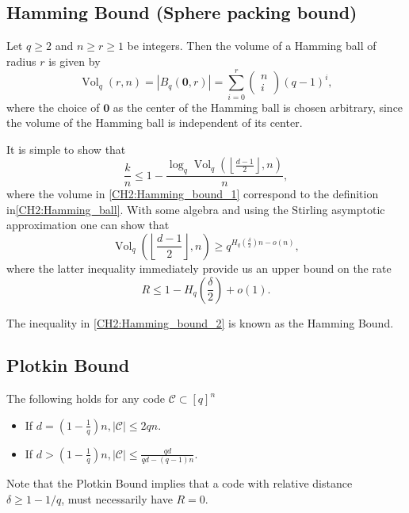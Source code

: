 \subsection{Hamming Bound (Sphere packing bound)}
\begin{definition}
Let $ q\geq2$ and $n \geq r \geq 1$ be integers. Then the volume of a Hamming ball of radius $r$ is given by
\begin{equation}
\operatorname{Vol}_{q}(r, n)=\left|B_{q}(\mathbf{0}, r)\right|=\sum_{i=0}^{r}\left(\begin{array}{l}
n \\
i
\end{array}\right)(q-1)^{i},
\label{CH2:Hamming_ball}
\end{equation}
where the choice of $\mathbf{0}$ as the center of the Hamming ball is chosen arbitrary, since the volume of the Hamming ball is independent of its center.
\end{definition}
It is simple to show that
\begin{equation}
\frac{k}{n} \leq 1-\frac{\log _{q} \operatorname{Vol}_{q}\left(\left\lfloor\frac{d-1}{2}\right\rfloor, n\right)}{n},
\label{CH2:Hamming_bound_1}
\end{equation}
where the volume in \eqref{CH2:Hamming_bound_1} correspond to the definition in\eqref{CH2:Hamming_ball}. With some algebra and using the Stirling asymptotic approximation one can show that
\begin{equation}
\operatorname{Vol}_{q}\left(\left\lfloor\frac{d-1}{2}\right\rfloor, n\right) \geq q^{H_{q}\left(\frac{\delta}{2}\right) n-o(n)},
\end{equation}
where the latter inequality immediately provide us an upper bound on the rate
\begin{equation}
R \leq 1-H_{q}\left(\frac{\delta}{2}\right)+o(1).
\label{CH2:Hamming_bound_2}
\end{equation}

The inequality in \eqref{CH2:Hamming_bound_2} is known as the Hamming Bound.

\subsection{Plotkin Bound}
\begin{definition}
The following holds for any code $\mathcal{C}\subset [q]^n$ 
\begin{itemize}
\item If $d=\left(1-\frac{1}{q}\right) n,|\mathcal{C}| \leq 2 q n$.
\item If $d>\left(1-\frac{1}{q}\right) n,|\mathcal{C}| \leq \frac{q d}{q d-(q-1) n}$.
\end{itemize}
Note that the Plotkin Bound implies that a code with relative distance $\delta\geq 1-1/q$, must necessarily have $R=0$.
\end{definition}

